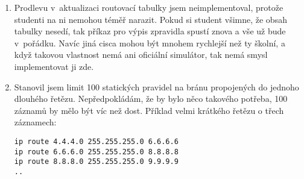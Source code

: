 \begin{enumerate}
 \item Prodlevu v~aktualizaci routovací tabulky jsem neimplementoval, protože studenti na ni nemohou téměř narazit. Pokud si student všimne, že obsah tabulky nesedí, tak příkaz pro výpis zpravidla spustí znova a vše už bude v~pořádku. Navíc jiná cisca mohou být mnohem rychlejší než ty školní, a když takovou vlastnost nemá ani oficiální simulátor, tak nemá smysl implementovat ji zde.

 \item Stanovil jsem limit 100 statických pravidel na bránu propojených do jednoho dlouhého řetězu. Nepředpokládám, že by bylo něco takového potřeba, 100 záznamů by mělo být víc než dost. Příklad velmi krátkého řetězu o třech záznamech:
\begin{verbatim}
ip route 4.4.4.0 255.255.255.0 6.6.6.6
ip route 6.6.6.0 255.255.255.0 8.8.8.8
ip route 8.8.8.0 255.255.255.0 9.9.9.9
..
\end{verbatim} 


\end{enumerate}


